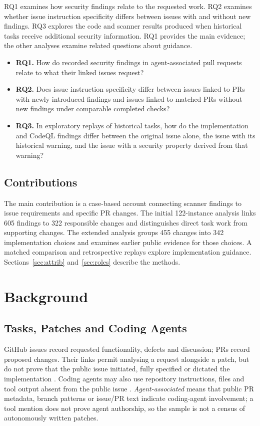 \documentclass[acmsmall,screen,nonacm]{acmart}
\begin{document}
RQ1 examines how security findings relate to the requested work. RQ2 examines whether issue instruction specificity differs between issues with and without new findings. RQ3 explores the code and scanner results produced when historical tasks receive additional security information. RQ1 provides the main evidence; the other analyses examine related questions about guidance.
\begin{itemize}
\item \textbf{RQ1.} How do recorded security findings in agent-associated pull requests relate to what their linked issues request?
\item \textbf{RQ2.} Does issue instruction specificity differ between issues linked to PRs with newly introduced findings and issues linked to matched PRs without new findings under comparable completed checks?
\item \textbf{RQ3.} In exploratory replays of historical tasks, how do the implementation and CodeQL findings differ between the original issue alone, the issue with its historical warning, and the issue with a security property derived from that warning?
\end{itemize}

\subsection{Contributions}

The main contribution is a case-based account connecting scanner findings to issue requirements and specific PR changes. The initial 122-instance analysis links 605 findings to 322 responsible changes and distinguishes direct task work from supporting changes. The extended analysis groups 455 changes into 342 implementation choices and examines earlier public evidence for those choices. A matched comparison and retrospective replays explore implementation guidance. Sections~\ref{sec:attrib} and~\ref{sec:roles} describe the methods.

\section{Background}

\subsection{Tasks, Patches and Coding Agents}

GitHub issues record requested functionality, defects and discussion; PRs record proposed changes. Their links permit analysing a request alongside a patch, but do not prove that the public issue initiated, fully specified or dictated the implementation \cite{b5}. Coding agents may also use repository instructions, files and tool output absent from the public issue \cite{b20,b22}. \emph{Agent-associated} means that public PR metadata, branch patterns or issue/PR text indicate coding-agent involvement; a tool mention does not prove agent authorship, so the sample is not a census of autonomously written patches.
\end{document}
